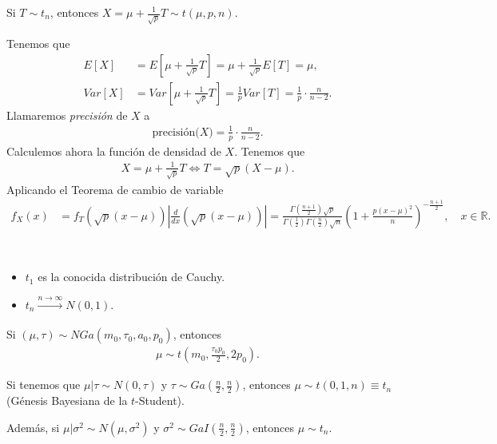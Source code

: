 \begin{defi}
    Si $T \sim t_n$, entonces $X = \mu + \frac{1}{\sqrt{p}}T \sim t(\mu,p,n)$.
\end{defi}
Tenemos que
\begin{align*}
    E[X]   & = E\left[\mu + \frac{1}{\sqrt{p}}T \right] = \mu + \frac{1}{\sqrt{p}} E[T] = \mu,                    \\
    Var[X] & =  Var\left[\mu + \frac{1}{\sqrt{p}}T \right] = \frac{1}{p}Var[T] = \frac{1}{p} \cdot \frac{n}{n-2}.
\end{align*}
Llamaremos \textit{precisión} de $X$ a
\begin{align*}
    \text{precisión($X$)} = \frac{1}{p} \cdot \frac{n}{n-2}.
\end{align*}
Calculemos ahora la función de densidad de $X$. Tenemos que
\begin{align*}
    X = \mu + \frac{1}{\sqrt{p}}T \Longleftrightarrow T = \sqrt{p}(X - \mu).
\end{align*}
Aplicando el Teorema de cambio de variable
\begin{align*}
    f_X(x) & = f_T\left( \sqrt{p} (x - \mu) \right) \left| \frac{d}{dx} \left( \sqrt{p}(x -\mu) \right) \right|
    = \frac{\Gamma\left( \frac{n+1}{2} \right)\sqrt{p}}{\Gamma\left( \frac{1}{2} \right)\Gamma\left( \frac{n}{2} \right)\sqrt{n}} \left(1 + \frac{p(x-\mu)^2}{n} \right)^{-\frac{n+1}{2}}, \quad x \in \mathbb{R}.
\end{align*}

\begin{obs} \
    \begin{itemize}
        \item $t_1$ es la conocida distribución de Cauchy.
        \item $t_n \xrightarrow[]{n \to \infty} N(0,1)$.
    \end{itemize}
\end{obs}

\begin{teo}
    Si $(\mu, \tau) \sim NGa(m_0,\tau_0,a_0,p_0)$, entonces
    \begin{align*}
        \mu \sim t\left(m_0,  \frac{\tau_0p_0}{2},2p_0 \right).
    \end{align*}
\end{teo}

\begin{obs}
    Si tenemos que $\mu | \tau \sim N(0,\tau)$ y $\tau \sim Ga\left( \frac{n}{2},\frac{n}{2}\right)$, entonces $\mu \sim t(0,1,n) \equiv t_n$ (Génesis Bayesiana de la $t$-Student).

    Además, si $\mu | \sigma^2 \sim N(\mu,\sigma^2)$ y $\sigma^2 \sim GaI\left( \frac{n}{2}, \frac{n}{2} \right)$, entonces $\mu \sim t_n$.
\end{obs}

